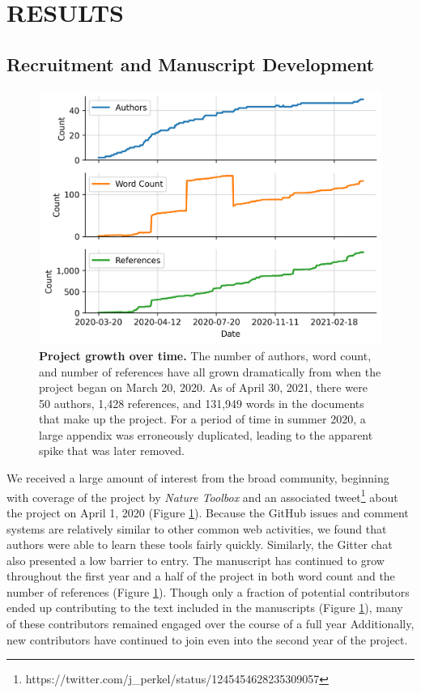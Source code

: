 \documentclass[twocolumn]{ceurart}
\begin{document}
\hypertarget{results}{%
\section{RESULTS}\label{results}}

\hypertarget{recruitment-and-manuscript-development}{%
\subsection{Recruitment and Manuscript Development}\label{recruitment-and-manuscript-development}}

\begin{figure}
\hypertarget{fig:projectstats}{%
\centering
\includegraphics{images/manuscript_stats.png}
\caption{\textbf{Project growth over time.}
The number of authors, word count, and number of references have all grown dramatically from when the project began on March 20, 2020.
As of April 30, 2021, there were 50 authors, 1,428 references, and 131,949 words in the documents that make up the project.
For a period of time in summer 2020, a large appendix was erroneously duplicated, leading to the apparent spike that was later removed.}\label{fig:projectstats}
}
\end{figure}

We received a large amount of interest from the broad community, beginning with coverage of the project by \emph{Nature Toolbox} \citep{AE0QcVgJ} and an associated tweet\footnote{https://twitter.com/j\_perkel/status/1245454628235309057} about the project on April 1, 2020 (Figure \ref{fig:projectstats}).
Because the GitHub issues and comment systems are relatively similar to other common web activities, we found that authors were able to learn these tools fairly quickly.
Similarly, the Gitter chat also presented a low barrier to entry.
The manuscript has continued to grow throughout the first year and a half of the project in both word count and the number of references (Figure \ref{fig:projectstats}).
Though only a fraction of potential contributors ended up contributing to the text included in the manuscripts (Figure \ref{fig:projectstats}), many of these contributors remained engaged over the course of a full year
Additionally, new contributors have continued to join even into the second year of the project.
\end{document}
